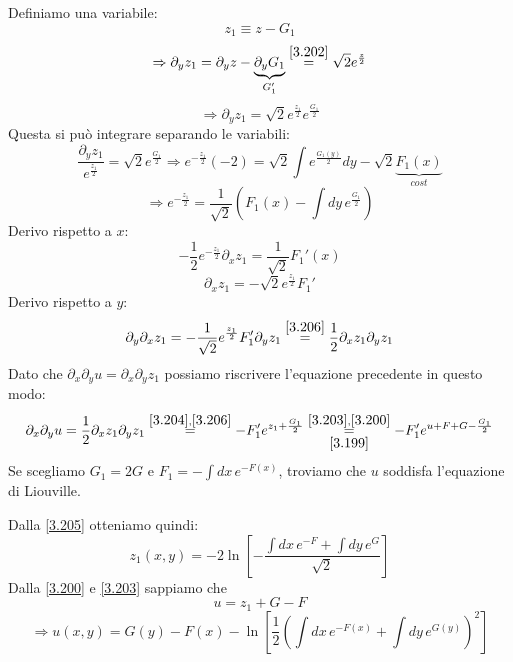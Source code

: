 \documentclass[a4paper,11pt]{report}
\begin{document}
Definiamo una variabile:
\begin{equation}
z_1 \equiv z-G_1
\label{3.203}
\end{equation}
\[
\Rightarrow \partial_y z_1 = \partial_y z- \underbrace{\partial_y G_1}_{G_1'}\overset{\eqref{3.202}}{=}\sqrt{2}e^\frac{z}{2}
\]
\begin{equation}
\Rightarrow \partial_y z_1=\sqrt{2}e^{\frac{z_1}{2}}e^{\frac{G_1}{2}} 
\label{3.204}
\end{equation}
Questa si pu\`o integrare separando le variabili:
\[
\frac{\partial_y z_1}{e^{\frac{z_1}{2}}}=\sqrt{2}e^{\frac{G_1}{2}} \Rightarrow e^{-\frac{z_1}{2}} (-2)=\sqrt{2}\int e^{\frac{G_1(y)}{2}} dy - \sqrt{2} \underbrace{F_1(x)}_{cost}
\]
\begin{equation}
\Rightarrow e^{-\frac{z_1}{2}}=\frac{1}{\sqrt{2}}\left(F_1(x) - \int dy\, e^{\frac{G_1}{2}}\right) 
\label{3.205}
\end{equation}
Derivo rispetto a $x$:
\[
-\frac{1}{2} e^{-\frac{z_1}{2}} \partial_x z_1=\frac{1}{\sqrt{2}}F_1'(x) 
\]
\begin{equation}
\partial_x z_1 = -\sqrt{2}e^{\frac{z_1}{2}}F_1' 
\label{3.206}
\end{equation}
Derivo rispetto a $y$:
\[
\partial_y \partial_x z_1 = -\frac{1}{\sqrt{2}}e^{\frac{z_1}{2}} F_1' \partial_y z_1\overset{\eqref{3.206}}{=} \frac{1}{2}\partial_x z_1 \partial_y z_1
\]
Dato che $\partial_x\partial_y u = \partial_x\partial_y z_1$ possiamo riscrivere l'equazione precedente in questo modo:
\begin{equation}
\partial_x\partial_y u =\frac{1}{2} \partial_x z_1 \partial_y z_1 \overset{\eqref{3.204},\eqref{3.206}}{=} -F_1' e^{z_1 + \frac{G_1}{2}} \overset{\eqref{3.203},\eqref{3.200}}{\underset{\eqref{3.199}}{=}} -F_1'e^{u+F+G-\frac{G_1}{2}} 
\label{3.207}
\end{equation}
Se scegliamo $G_1=2G$ e $F_1=-\int dx\, e^{-F(x)}$, troviamo che $u$ soddisfa l'equazione di Liouville.

Dalla \eqref{3.205} otteniamo quindi:
\begin{equation}
z_1(x,y)=-2\ln \left[-\frac{\int dx\, e^{-F} + \int dy\, e^G}{\sqrt{2}} \right] 
\label{3.208}
\end{equation}
Dalla \eqref{3.200} e \eqref{3.203} sappiamo che
\[
u=z_1+G-F
\]
\begin{equation}
\Rightarrow u(x,y)=G(y)-F(x) - \ln\left[\frac{1}{2}\left(\int dx\, e^{-F(x)} + \int dy\, e^{G(y)}\right)^2 \right] 
\label{3.209}
\end{equation}
\end{document}
